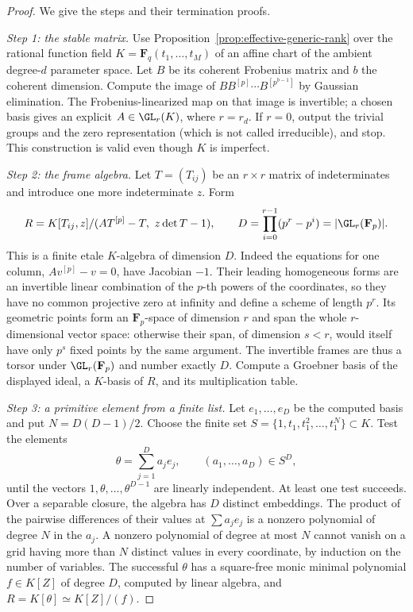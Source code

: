 \begin{proof}
We give the steps and their termination proofs.

\emph{Step 1: the stable matrix.}
Use Proposition~\ref{prop:effective-generic-rank} over
the rational function field $K=\mathbf F_q(t_1,\ldots,t_M)$
of an affine chart of the ambient degree-$d$ parameter
space.  Let $B$ be its coherent Frobenius matrix and
$b$ the coherent dimension.  Compute the image of
$B B^{[p]}\cdots B^{[p^{b-1}]}$ by Gaussian elimination.
The Frobenius-linearized map on that image is invertible;
a chosen basis gives an explicit $A\in\GL_r(K)$, where
$r=r_d$.  If $r=0$, output the trivial groups and the zero
representation (which is not called irreducible), and stop.
This construction is valid even though $K$ is imperfect.

\emph{Step 2: the frame algebra.}
Let $T=(T_{ij})$ be an $r\times r$ matrix of indeterminates
and introduce one more indeterminate $z$.  Form
\begin{equation}\label{eq:effective-frame-algebra}
 R=K[T_{ij},z]/
        (A T^{[p]}-T,\ z\det T-1),\qquad
 D=\prod_{i=0}^{r-1}(p^r-p^i)=|\GL_r(\mathbf F_p)|.
\end{equation}
This is a finite etale $K$-algebra of dimension $D$.
Indeed the equations for one column, $Av^{[p]}-v=0$,
have Jacobian $-1$.  Their leading homogeneous forms
are an invertible linear combination of the $p$-th
powers of the coordinates, so they have no common
projective zero at infinity and define a scheme of
length $p^r$.  Its geometric points form an
$\mathbf F_p$-space of dimension $r$ and span the
whole $r$-dimensional vector space: otherwise their
span, of dimension $s<r$, would itself have only
$p^s$ fixed points by the same argument.
The invertible frames are thus a torsor under
$\GL_r(\mathbf F_p)$ and number exactly $D$.
Compute a Groebner basis of the displayed ideal,
a $K$-basis of $R$, and its multiplication table.

\emph{Step 3: a primitive element from a finite list.}
Let $e_1,\ldots,e_D$ be the computed basis and put
$N=D(D-1)/2$.  Choose the finite set
$S=\{1,t_1,t_1^2,\ldots,t_1^N\}\subset K$.
Test the elements
\[
 \theta=\sum_{j=1}^D a_j e_j,\qquad (a_1,\ldots,a_D)\in S^D,
\]
until the vectors $1,\theta,\ldots,\theta^{D-1}$ are
linearly independent.  At least one test succeeds.
Over a separable closure, the algebra has $D$ distinct
embeddings.  The product of the pairwise differences
of their values at $\sum a_je_j$ is a nonzero polynomial
of degree $N$ in the $a_j$.  A nonzero polynomial of
degree at most $N$ cannot vanish on a grid having more
than $N$ distinct values in every coordinate, by
induction on the number of variables.  The successful
$\theta$ has a square-free monic minimal polynomial
$f\in K[Z]$ of degree $D$, computed by linear algebra,
and $R=K[\theta]\simeq K[Z]/(f)$.


\end{proof}
